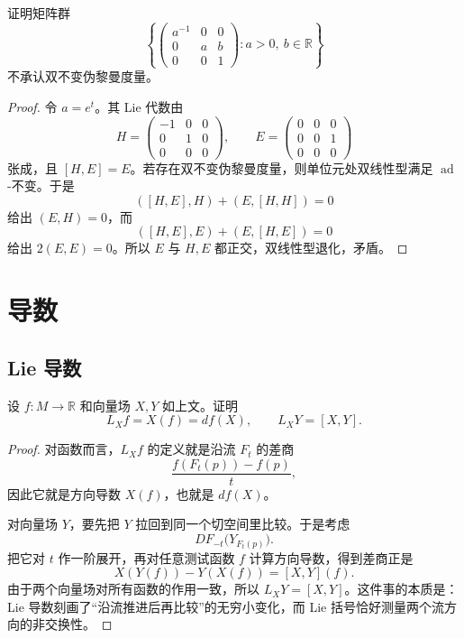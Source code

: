 \documentclass[11pt,a4paper,openany]{ctexbook}
\numberwithin{equation}{chapter}
\begin{document}
\begin{problem}
证明矩阵群
\[
\left\{\begin{pmatrix}a^{-1}&0&0\\0&a&b\\0&0&1\end{pmatrix}:a>0,\ b\in\mathbb R\right\}
\]
不承认双不变伪黎曼度量。
\end{problem}
\begin{proof}
令 \(a=e^t\)。其 Lie 代数由
\[
H=\begin{pmatrix}-1&0&0\\0&1&0\\0&0&0\end{pmatrix},\qquad
E=\begin{pmatrix}0&0&0\\0&0&1\\0&0&0\end{pmatrix}
\]
张成，且 \([H,E]=E\)。若存在双不变伪黎曼度量，则单位元处双线性型满足 \(\operatorname{ad}\)-不变。于是
\[
([H,E],H)+(E,[H,H])=0
\]
给出 \((E,H)=0\)，而
\[
([H,E],E)+(E,[H,E])=0
\]
给出 \(2(E,E)=0\)。所以 \(E\) 与 \(H,E\) 都正交，双线性型退化，矛盾。
\end{proof}

\chapter{导数}

\section{Lie 导数}

\begin{problem}
设 \(f\colon M\to\mathbb R\) 和向量场 \(X,Y\) 如上文。证明
\[
L_X f= X(f)=df(X),\qquad L_XY=[X,Y].
\]
\end{problem}
\begin{proof}
对函数而言，\(L_X f\) 的定义就是沿流 \(F_t\) 的差商
\[
\frac{f(F_t(p))-f(p)}{t},
\]
因此它就是方向导数 \(X(f)\)，也就是 \(df(X)\)。

对向量场 \(Y\)，要先把 \(Y\) 拉回到同一个切空间里比较。于是考虑
\[
DF_{-t}\bigl(Y_{F_t(p)}\bigr).
\]
把它对 \(t\) 作一阶展开，再对任意测试函数 \(f\) 计算方向导数，得到差商正是
\[
X(Y(f))-Y(X(f))=[X,Y](f).
\]
由于两个向量场对所有函数的作用一致，所以 \(L_XY=[X,Y]\)。这件事的本质是：Lie 导数刻画了“沿流推进后再比较”的无穷小变化，而 Lie 括号恰好测量两个流方向的非交换性。
\end{proof}
\end{document}
